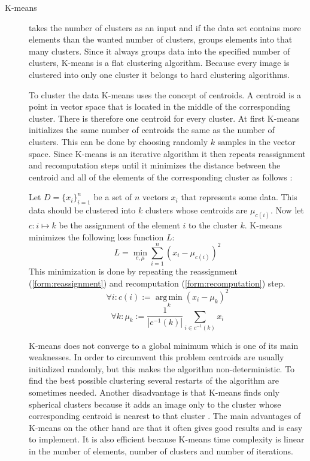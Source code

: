 \documentclass[journal]{vgtc}       %
\begin{document}
\begin{description}
\item [K-means] takes the number of clusters as an input and if the data set contains more elements than the wanted number of clusters, groups elements into that many clusters. Since it always groups data into the specified number of clusters, K-means is a flat clustering algorithm. Because every image is clustered into only one cluster it belongs to hard clustering algorithms. 

To cluster the data K-means uses the concept of centroids. A centroid is a point in vector space that is located in the middle of the corresponding cluster. There is therefore one centroid for every cluster. 
At first K-means initializes the same number of centroids the same as the number of clusters. This can be done by choosing randomly $k$ samples  in the vector space. Since K-means is an iterative algorithm  it then repeats reassignment and recomputation steps until it minimizes the distance between the centroid and all of the elements of the corresponding cluster as follows \cite{KI17}: 

Let $D = \{x_i\}_{i=1}^n$ be a set of $n$ vectors $x_i$ that represents some data. This data should be clustered into $k$ clusters whose centroids are  $\mu_{c(i)}$. Now let $c: i \mapsto k$ be the assignment of the element $i$ to the cluster $k$. 
K-means minimizes the following loss function $L$:
\begin{equation}
\label{form: loss}
L = \min_{c, \mu} \sum_{i=1}^{n}(x_i - \mu_{c(i)})^2
\end{equation} 
This minimization is done by repeating the reassignment (\ref{form:reassignment}) and recomputation (\ref{form:recomputation}) step.
\begin{equation}
\label{form:reassignment}
\forall i: c(i) := \operatorname*{arg\,min}_k (x_i - \mu_k)^2
\end{equation}
\begin{equation}
\label{form:recomputation}
\forall k: \mu_k := \frac{1}{|c^{-1}(k)|} \sum_{i \in c^{-1}(k)} x_i
\end{equation}


K-means does not converge to a  global minimum which is one of its main weaknesses. In order to circumvent this problem centroids are usually initialized randomly, but this makes  the algorithm non-deterministic. To find the best possible clustering  several restarts of the algorithm are  sometimes needed.  Another disadvantage is that K-means finds only spherical clusters because it adds an image only to the cluster whose corresponding  centroid is nearest to that cluster \cite{jain2010data}. The main advantages of K-means  on the other hand are that it often gives good results and is easy to implement. It is also efficient because K-means time complexity is linear in the number of elements, number of clusters and number of iterations. 



\end{description}
\end{document}
